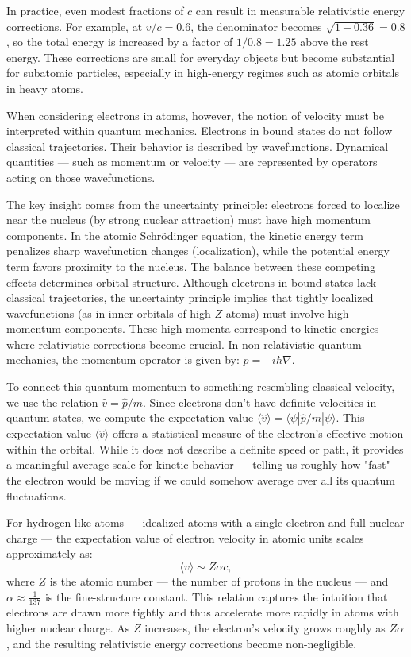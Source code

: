 In practice, even modest fractions of \( c \) can result in measurable relativistic energy corrections. For example, at \( v/c = 0.6 \), the denominator becomes \( \sqrt{1 - 0.36} = 0.8 \), so the total energy is increased by a factor of \( 1/0.8 = 1.25 \) above the rest energy. These corrections are small for everyday objects but become substantial for subatomic particles, especially in high-energy regimes such as atomic orbitals in heavy atoms.

When considering electrons in atoms, however, the notion of velocity must be interpreted within quantum mechanics. Electrons in bound states do not follow classical trajectories. Their behavior is described by wavefunctions. Dynamical quantities — such as momentum or velocity — are represented by operators acting on those wavefunctions.

The key insight comes from the uncertainty principle: electrons forced to localize near the nucleus (by strong nuclear attraction) must have high momentum components. In the atomic Schrödinger equation, the kinetic energy term penalizes sharp wavefunction changes (localization), while the potential energy term favors proximity to the nucleus. The balance between these competing effects determines orbital structure. Although electrons in bound states lack classical trajectories, the uncertainty principle implies that tightly localized wavefunctions (as in inner orbitals of high-$Z$ atoms) must involve high-momentum components. These high momenta correspond to kinetic energies where relativistic corrections become crucial. In non-relativistic quantum mechanics, the momentum operator is given by: $\hat{p} = -i\hbar \nabla.$

To connect this quantum momentum to something resembling classical velocity, we use the relation \( \hat{v} = \hat{p}/m \). Since electrons don't have definite velocities in quantum states, we compute the expectation value \( \langle \hat{v} \rangle = \langle \psi | \hat{p}/m | \psi \rangle \). This expectation value \( \langle \hat{v} \rangle \) offers a statistical measure of the electron's effective motion within the orbital. While it does not describe a definite speed or path, it provides a meaningful average scale for kinetic behavior — telling us roughly how "fast" the electron would be moving if we could somehow average over all its quantum fluctuations.

For hydrogen-like atoms — idealized atoms with a single electron and full nuclear charge — the expectation value of electron velocity in atomic units scales approximately as:
\[
\langle v \rangle \sim Z\alpha c,
\]
where \( Z \) is the atomic number — the number of protons in the nucleus — and \( \alpha \approx \tfrac{1}{137} \) is the fine-structure constant. This relation captures the intuition that electrons are drawn more tightly and thus accelerate more rapidly in atoms with higher nuclear charge. As \( Z \) increases, the electron’s velocity grows roughly as \( Z\alpha \), and the resulting relativistic energy corrections become non-negligible.

